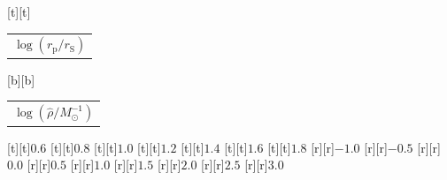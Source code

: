 %    
%
%
\begin{psfrags}%
\psfragscanon%
%
[t][t]{\color[rgb]{0,0,0}\setlength{\tabcolsep}{0pt}\begin{tabular}{c}{\Large$\log\left(r_\mathrm{p}/r_\mathrm{S}\right)$}\end{tabular}}%
[b][b]{\color[rgb]{0,0,0}\setlength{\tabcolsep}{0pt}\begin{tabular}{c}{\Large$\log\left(\hat{\rho}/M_\odot^{-1}\right)$}\end{tabular}}%
%
[t][t]{$0.6$}%
[t][t]{$0.8$}%
[t][t]{$1.0$}%
[t][t]{$1.2$}%
[t][t]{$1.4$}%
[t][t]{$1.6$}%
[t][t]{$1.8$}%
%
[r][r]{$-1.0$}%
[r][r]{$-0.5$}%
[r][r]{$0.0$}%
[r][r]{$0.5$}%
[r][r]{$1.0$}%
[r][r]{$1.5$}%
[r][r]{$2.0$}%
[r][r]{$2.5$}%
[r][r]{$3.0$}%
%
%
\end{psfrags}%
%
